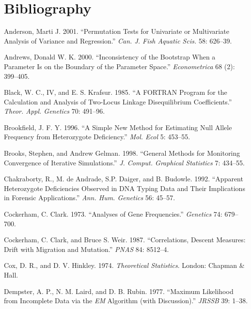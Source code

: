 \documentclass[12pt,]{book}
\begin{document}
\printindex

\chapter*{Bibliography}\label{bibliography}

\hypertarget{refs}{}
\hypertarget{ref-Anderson01}{}
Anderson, Marti J. 2001. ``Permutation Tests for Univariate or
Multivariate Analysis of Variance and Regression.'' \emph{Can. J. Fish
Aquatic Scis.} 58: 626--39.

\hypertarget{ref-Andrews00}{}
Andrews, Donald W. K. 2000. ``Inconsistency of the Bootstrap When a
Parameter Is on the Boundary of the Parameter Space.''
\emph{Econometrica} 68 (2): 399--405.

\hypertarget{ref-BlackK85}{}
Black, W. C., IV, and E. S. Krafsur. 1985. ``A FORTRAN Program for the
Calculation and Analysis of Two-Locus Linkage Disequilibrium
Coefficients.'' \emph{Theor. Appl. Genetics} 70: 491--96.

\hypertarget{ref-Brookfield96}{}
Brookfield, J. F. Y. 1996. ``A Simple New Method for Estimating Null
Allele Frequency from Heterozygote Deficiency.'' \emph{Mol. Ecol} 5:
453--55.

\hypertarget{ref-BrooksG98}{}
Brooks, Stephen, and Andrew Gelman. 1998. ``General Methods for
Monitoring Convergence of Iterative Simulations.'' \emph{J. Comput.
Graphical Statistics} 7: 434--55.

\hypertarget{ref-ChakrabortyADB92}{}
Chakraborty, R., M. de Andrade, S.P. Daiger, and B. Budowle. 1992.
``Apparent Heterozygote Deficiencies Observed in DNA Typing Data and
Their Implications in Forensic Applications.'' \emph{Ann. Hum. Genetics}
56: 45--57.

\hypertarget{ref-Cockerham73}{}
Cockerham, C. Clark. 1973. ``Analyses of Gene Frequencies.''
\emph{Genetics} 74: 679--700.

\hypertarget{ref-CockerhamW87}{}
Cockerham, C. Clark, and Bruce S. Weir. 1987. ``Correlations, Descent
Measures: Drift with Migration and Mutation.'' \emph{PNAS} 84: 8512--4.

\hypertarget{ref-CoxH74}{}
Cox, D. R., and D. V. Hinkley. 1974. \emph{Theoretical Statistics}.
London: Chapman \& Hall.

\hypertarget{ref-DempsterLR77}{}
Dempster, A. P., N. M. Laird, and D. B. Rubin. 1977. ``Maximum
Likelihood from Incomplete Data via the \emph{EM} Algorithm (with
Discussion).'' \emph{JRSSB} 39: 1--38.
\end{document}
